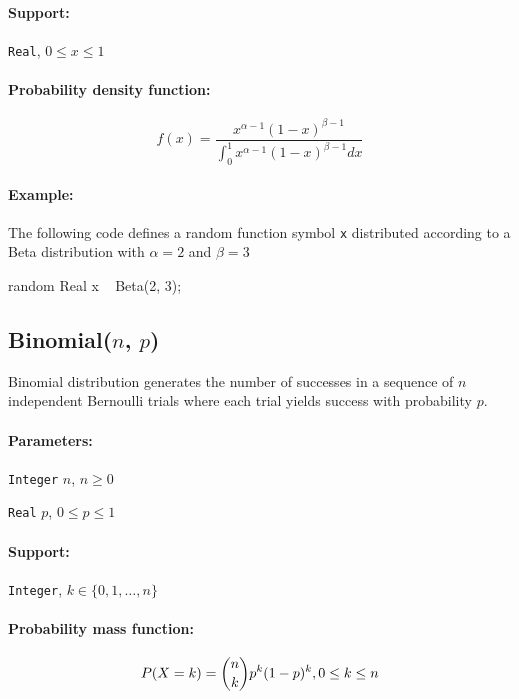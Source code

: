 \paragraph*{Support:} \verb|Real|, $0 \leq x \leq 1$ 

\paragraph*{Probability density function:}
\[
	f(x) = \frac{x^{\alpha - 1} (1-x)^{\beta - 1}}{\int_{0}^{1} x^{\alpha - 1} (1-x)^{\beta - 1} dx}
\]

\paragraph*{Example:}
The following code defines a random function symbol \verb|x| distributed according to a Beta distribution with $\alpha = 2$ and $\beta = 3$
\begin{blogcode}
random Real x ~ Beta(2, 3);
\end{blogcode}


\subsection{Binomial($n$, $p$)} 
Binomial distribution generates the number of successes in a sequence of $n$ independent Bernoulli trials where each trial yields success with probability $p$.

\paragraph*{Parameters:} 

\begin{itemize*}
\item[] \verb|Integer| $n$, $n \geq 0$
\item[] \verb|Real| $p$, $0 \leq p \leq 1$
\end{itemize*}

\paragraph*{Support:} \verb|Integer|, $k \in \{0, 1, \ldots, n\} $

\paragraph*{Probability mass function:}
\[
	P(X = k) = \binom{n}{k}p^{k}(1-p)^{k} , 0 \leq k \leq n \\
\]

